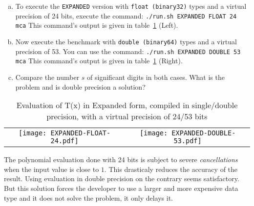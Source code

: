 \begin{question}
  \begin{enumerate}[(a)]
    \item To execute the {\tt EXPANDED} version with {\tt float (binary32)} types and a virtual precision of 24 bits, execute the command: {\tt ./run.sh EXPANDED FLOAT 24 mca} \newline
          This command's output is given in table~\ref{fig:exp_24_53} (Left).
    \item Now execute the benchmark with {\tt double (binary64)} types and a virtual precision of 53. You can use
          the command: {\tt ./run.sh EXPANDED DOUBLE 53 mca} \newline
          This command's output is given in table~\ref{fig:exp_24_53} (Right).
    \item Compare the number $s$ of significant digits in both cases. What is the problem and is double precision a solution?
  \end{enumerate}
\end{question}

\begin{table}
  \begin{tabular}{cc}
    \texttt{[image: EXPANDED-FLOAT-24.pdf]} &
    \texttt{[image: EXPANDED-DOUBLE-53.pdf]}  \\
  \end{tabular}
  \caption{Evaluation of T(x) in Expanded form, compiled in single/double precision, with a virtual precision of 24/53 bits}
  \label{fig:exp_24_53}
\end{table}

The polynomial evaluation done with 24 bits is subject to severe {\it cancellations} when the input value is close to $1$.
This drasticaly reduces the accuracy of the result.
Using evaluation in double precision on the contrary seems satisfactory. But
this solution forces the developer to use a larger and more expensive data type
and it does not solve the problem, it only delays it.

\FloatBarrier

